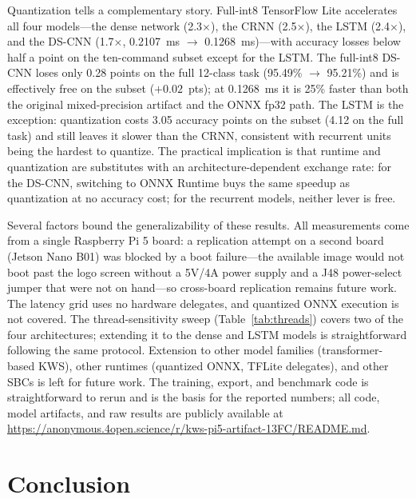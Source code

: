 \documentclass[conference,a4paper]{IEEEtran}
\begin{document}
Quantization tells a complementary story. Full-int8 TensorFlow Lite accelerates all four models---the dense network (2.3$\times$), the CRNN (2.5$\times$), the LSTM (2.4$\times$), and the DS-CNN (1.7$\times$, 0.2107~ms $\rightarrow$ 0.1268~ms)---with accuracy losses below half a point on the ten-command subset except for the LSTM. The full-int8 DS-CNN loses only 0.28 points on the full 12-class task (95.49\% $\rightarrow$ 95.21\%) and is effectively free on the subset ($+0.02$~pts); at 0.1268~ms it is 25\% faster than both the original mixed-precision artifact and the ONNX fp32 path. The LSTM is the exception: quantization costs 3.05 accuracy points on the subset (4.12 on the full task) and still leaves it slower than the CRNN, consistent with recurrent units being the hardest to quantize. The practical implication is that runtime and quantization are substitutes with an architecture-dependent exchange rate: for the DS-CNN, switching to ONNX Runtime buys the same speedup as quantization at no accuracy cost; for the recurrent models, neither lever is free.

Several factors bound the generalizability of these results. All measurements come from a single Raspberry Pi 5 board: a replication attempt on a second board (Jetson Nano B01) was blocked by a boot failure---the available image would not boot past the logo screen without a 5V/4A power supply and a J48 power-select jumper that were not on hand---so cross-board replication remains future work. The latency grid uses no hardware delegates, and quantized ONNX execution is not covered. The thread-sensitivity sweep (Table~\ref{tab:threads}) covers two of the four architectures; extending it to the dense and LSTM models is straightforward following the same protocol. Extension to other model families (transformer-based KWS), other runtimes (quantized ONNX, TFLite delegates), and other SBCs is left for future work. The training, export, and benchmark code is straightforward to rerun and is the basis for the reported numbers; all code, model artifacts, and raw results are publicly available at \url{https://anonymous.4open.science/r/kws-pi5-artifact-13FC/README.md}.

\section{Conclusion}
\end{document}
